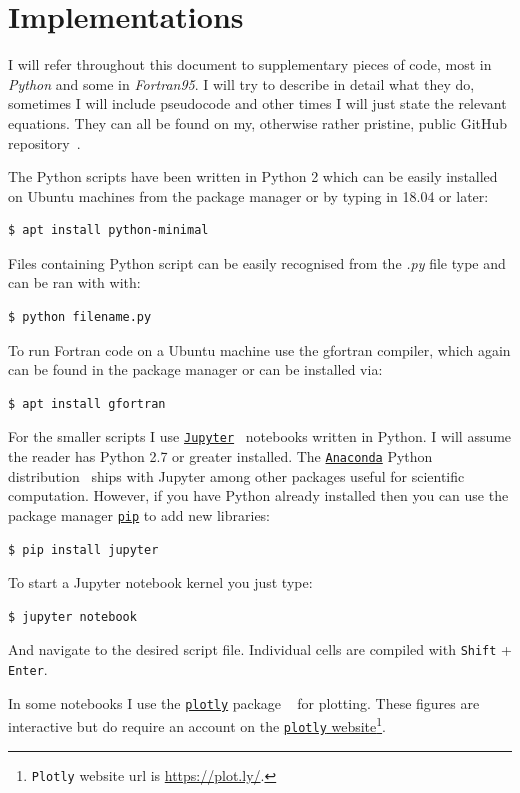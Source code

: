 \section{Implementations}

I will refer throughout this document to supplementary pieces of code, most in \emph{Python} and some in \emph{Fortran95}. I will try to describe in detail what they do, sometimes I will include pseudocode and other times I will just state the relevant equations. They can all be found on my, otherwise rather pristine, public GitHub repository~\cite{myGitHub}. 

The Python scripts have been written in Python 2 which can be easily installed on Ubuntu machines from the package manager or by typing in 18.04 or later:
\begin{verbatim}
$ apt install python-minimal
\end{verbatim}
Files containing Python script can be easily recognised from the \textit{.py} file type and can be ran with with:
\begin{verbatim}
$ python filename.py
\end{verbatim}

To run Fortran code on a Ubuntu machine use the gfortran compiler, which again can be found in the package manager or can be installed via:
\begin{verbatim}
$ apt install gfortran
\end{verbatim}

For the smaller scripts I use \href{http://jupyter.org}{\texttt{Jupyter}}~\cite{Jupyter} notebooks written in Python. I will assume the reader has Python 2.7 or greater installed. The \href{https://anaconda.org/}{\texttt{Anaconda}} Python distribution~\cite{Conda} ships with Jupyter among other packages useful for scientific computation. However, if you have Python already installed then you can use the package manager \href{https://pypi.org/project/pip/}{\texttt{pip}} to add new libraries:
\begin{verbatim}
$ pip install jupyter
\end{verbatim}
To start a Jupyter notebook kernel you just type:
\begin{verbatim}
$ jupyter notebook
\end{verbatim}
And navigate to the desired script file. Individual cells are compiled with \texttt{Shift} + \texttt{Enter}.

In some notebooks I use the \href{https://plot.ly/}{\texttt{plotly}} package ~\cite{Plotly} for plotting. These figures are interactive but do require an account on the \href{https://plot.ly/}{\texttt{plotly} website}\footnote{ \texttt{Plotly} website url is \href{https://plot.ly/}{https://plot.ly/}.}.  


